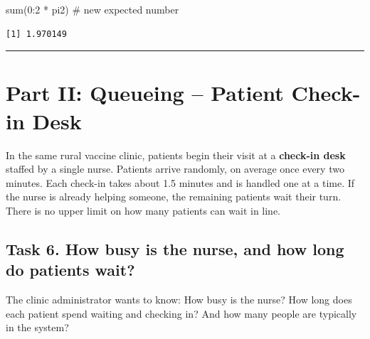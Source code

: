\documentclass[
]{article}
\newenvironment{Shaded}{\begin{snugshade}}{\end{snugshade}}
\newcommand{\CommentTok}[1]{\textcolor[rgb]{0.37,0.37,0.37}{#1}}
\newcommand{\DecValTok}[1]{\textcolor[rgb]{0.68,0.00,0.00}{#1}}
\newcommand{\FunctionTok}[1]{\textcolor[rgb]{0.28,0.35,0.67}{#1}}
\newcommand{\NormalTok}[1]{\textcolor[rgb]{0.00,0.23,0.31}{#1}}
\newcommand{\SpecialCharTok}[1]{\textcolor[rgb]{0.37,0.37,0.37}{#1}}
\begin{document}
\begin{Shaded}
\begin{Highlighting}[]
\FunctionTok{sum}\NormalTok{(}\DecValTok{0}\SpecialCharTok{:}\DecValTok{2} \SpecialCharTok{*}\NormalTok{ pi2)  }\CommentTok{\# new expected number}
\end{Highlighting}
\end{Shaded}

\begin{verbatim}
[1] 1.970149
\end{verbatim}

\begin{center}\rule{0.5\linewidth}{0.5pt}\end{center}

\section{Part II: Queueing -- Patient Check-in
Desk}\label{part-ii-queueing-patient-check-in-desk}

In the same rural vaccine clinic, patients begin their visit at a
\textbf{check-in desk} staffed by a single nurse. Patients arrive
randomly, on average once every two minutes. Each check-in takes about
1.5 minutes and is handled one at a time. If the nurse is already
helping someone, the remaining patients wait their turn. There is no
upper limit on how many patients can wait in line.

\subsection{Task 6. How busy is the nurse, and how long do patients
wait?}\label{task-6.-how-busy-is-the-nurse-and-how-long-do-patients-wait}

The clinic administrator wants to know: How busy is the nurse? How long
does each patient spend waiting and checking in? And how many people are
typically in the system?
\end{document}
